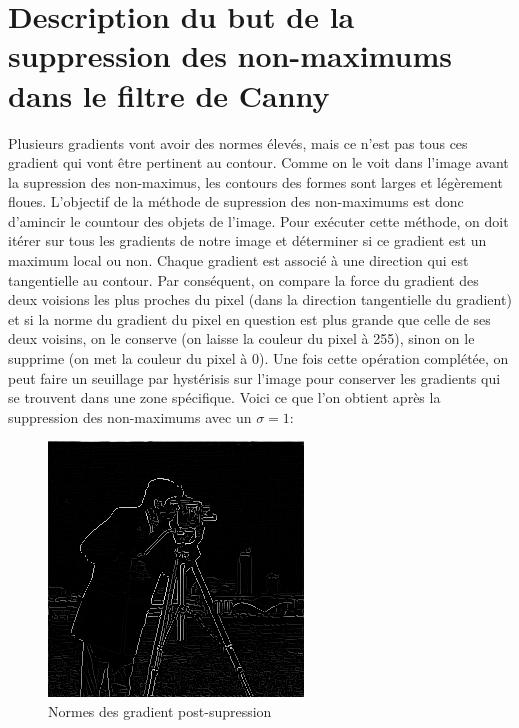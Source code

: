 \documentclass{article}
\begin{document}
\section*{Description du but de la suppression des non-maximums dans le filtre de Canny}
Plusieurs gradients vont avoir des normes élevés, mais ce n'est pas tous ces gradient qui vont être pertinent au contour. Comme on le voit dans 
l'image avant la supression des non-maximus, les contours des formes sont larges et légèrement floues. L'objectif de la méthode
de supression des non-maximums est donc d'amincir le countour des objets de l'image. Pour exécuter cette méthode, on doit itérer sur tous les gradients de notre
image et déterminer si ce gradient est un maximum local ou non. Chaque gradient est associé à une direction qui est tangentielle au contour. Par conséquent,
on compare la force du gradient des deux voisions les plus proches du pixel (dans la direction tangentielle du gradient) et si la norme du gradient du pixel
en question est plus grande que celle de ses deux voisins, on le conserve (on laisse la couleur du pixel à 255), sinon on le supprime (on met la couleur
du pixel à 0). Une fois cette opération complétée, on peut faire un seuillage par hystérisis sur l'image pour conserver les gradients qui se trouvent 
dans une zone spécifique. Voici ce que l'on obtient après la suppression des non-maximums avec un $\sigma = 1$:
\begin{figure}[H]
    \centering
    \includegraphics[scale = 0.5]{TpIFT6150-2-suppression.png}
    \caption{Normes des gradient post-supression}
\end{figure}
\end{document}
